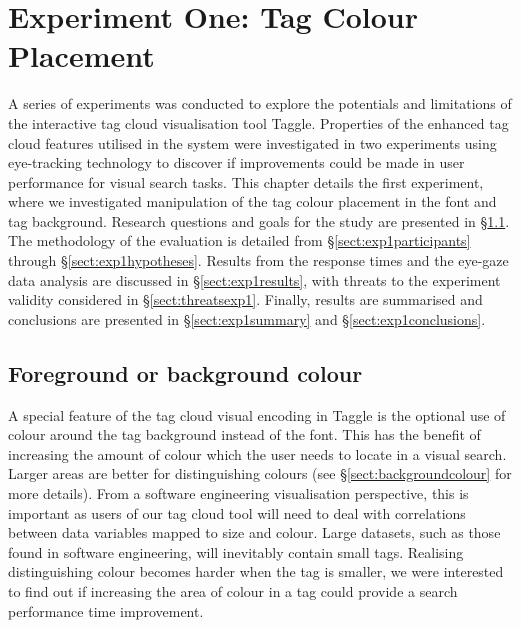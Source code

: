 \chapter[Experiment One: Tag Colour Placement]{Experiment One: Tag Colour Placement}
\label{chap:exp1}
\ifpdf
    \graphicspath{{Chapters/ExperimentOne/Exp1Figs/PNG/}{Chapters/ExperimentOne/Exp1Figs/PDF/}{Chapters/ExperimentOne/Exp1Figs/}}
\else
    \graphicspath{{Chapters/ExperimentOne/Exp1Figs/EPS/}{Chapters/ExperimentOne/Exp1Figs/}}
\fi  

A series of experiments was conducted to explore the potentials and limitations of the interactive tag cloud visualisation tool Taggle. Properties of the enhanced tag cloud features utilised in the system were investigated in two experiments using eye-tracking technology to discover if improvements could be made in user performance for visual search tasks. This chapter details the first experiment, where we investigated manipulation of the tag colour placement in the font and tag background. Research questions and goals for the study are presented in \S\ref{sect:experimentone}. The methodology of the evaluation is detailed from \S\ref{sect:exp1participants} through \S\ref{sect:exp1hypotheses}. Results from the response times and the eye-gaze data analysis are discussed in \S\ref{sect:exp1results}, with threats to the experiment validity considered in \S\ref{sect:threatsexp1}. Finally, results are summarised and conclusions are presented in \S\ref{sect:exp1summary} and \S\ref{sect:exp1conclusions}. 

\section{Foreground or background colour}\label{sect:experimentone}

A special feature of the tag cloud visual encoding in Taggle is the optional use of colour around the tag background instead of the font. This has the benefit of increasing the amount of colour which the user needs to locate in a visual search. Larger areas are better for distinguishing colours (see \S\ref{sect:backgroundcolour} for more details). From a software engineering visualisation perspective, this is important as users of our tag cloud tool will need to deal with correlations between data variables mapped to size and colour. Large datasets, such as those found in software engineering, will inevitably contain small tags. Realising distinguishing colour becomes harder when the tag is smaller, we were interested to find out if increasing the area of colour in a tag could provide a search performance time improvement.

